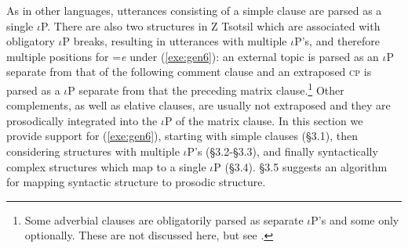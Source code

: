 \documentclass[output=paper,
modfonts
]{LSP/langsci}
\begin{document}
As in other languages, utterances consisting of a simple clause are parsed as a single  $\iota$P. There are also two structures in Z Tsotsil 
which  are associated with obligatory $\iota$P breaks, resulting in utterances with multiple  $\iota$P's, and therefore multiple positions 
for =\emph{e} under (\ref{exe:gen6}): an external topic is parsed as an $\iota$P separate from that of the following 
comment clause and
an extraposed \textsc{cp} is parsed as a $\iota$P separate from that the preceding matrix clause.\footnote
{Some adverbial clauses are obligatorily parsed as separate $\iota$P's and some only optionally. These are
not discussed here, but see \citet[59]{aissen1992}.}
Other complements, as well as elative clauses, are usually not extraposed and they are prosodically integrated into the $\iota$P  of the matrix clause.
In this section we provide support for (\ref{exe:gen6}), starting with simple clauses (\S3.1), then considering structures with multiple  $\iota$P's (\S3.2-\S3.3),
and finally syntactically complex structures which map to a single $\iota$P (\S3.4).  \S3.5 suggests
an algorithm for mapping syntactic structure to prosodic structure.
\end{document}
